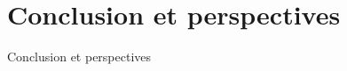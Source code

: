 \section{Conclusion et perspectives}
  \begin{frame}[allowframebreaks]{Conclusion et perspectives}
    \framesubtitle{}
  \end{frame}

